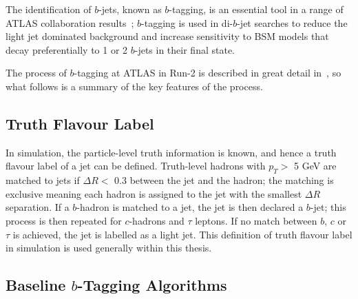The identification of $b$-jets, known as $b$-tagging, is an essential tool in a range of ATLAS collaboration results~\cite{obj-ttbar,obj-Hbb};
$b$-tagging is used in di-$b$-jet searches to reduce the light jet dominated background and increase 
sensitivity to BSM models that decay preferentially to 1 or 2 $b$-jets in their final state.

The process of $b$-tagging at ATLAS in Run-2 is described in great
detail in~\cite{obj-bjets_algo_2015,obj-bjets_algo_2016},
so what follows is a summary of the key features of the process.

\subsection{Truth Flavour Label}
\label{sec:obj-bjets_label}

In simulation, the particle-level truth information is known, and hence a truth flavour label of a jet can be defined.
Truth-level hadrons with $p_{T} >$ 5 GeV are matched to jets if $\Delta R <$ 0.3 between the jet and the hadron;
the matching is exclusive meaning each hadron is assigned to the jet with the smallest $\Delta R$ separation.
If a $b$-hadron is matched to a jet, the jet is then declared a $b$-jet;
this process is then repeated for $c$-hadrons and $\tau$ leptons.
If no match between $b$, $c$ or $\tau$ is achieved, the jet is labelled as a light jet.
This definition of truth flavour label in simulation is used generally within this thesis.

   
\subsection{Baseline $b$-Tagging Algorithms}
\label{sec:obj-bjets_base}

